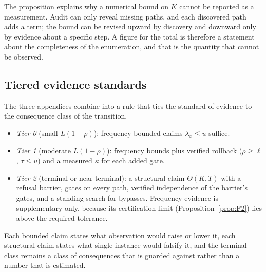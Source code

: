 \documentclass[11pt]{article}
\theoremstyle{definition}
\begin{document}
The proposition explains why a numerical bound on $K$ cannot be reported as a measurement. Audit can only reveal missing paths, and each discovered path adds a term; the bound can be revised upward by discovery and downward only by evidence about a specific step. A figure for the total is therefore a statement about the completeness of the enumeration, and that is the quantity that cannot be observed.

\subsection{Tiered evidence standards}

The three appendices combine into a rule that ties the standard of evidence to the consequence class of the transition.

\begin{itemize}[leftmargin=1.6em,itemsep=0.1em]
\item \emph{Tier 0} (small $L(1-\rho)$): frequency-bounded claims $\lambda_x\le u$ suffice.
\item \emph{Tier 1} (moderate $L(1-\rho)$): frequency bounds plus verified rollback ($\rho\ge\ell$, $\tau\le u$) and a measured $\kappa$ for each added gate.
\item \emph{Tier 2} (terminal or near-terminal): a structural claim $\Theta(K,T)$ with a refusal barrier, gates on every path, verified independence of the barrier's gates, and a standing search for bypasses. Frequency evidence is supplementary only, because its certification limit (Proposition~\ref{prop:F2}) lies above the required tolerance.
\end{itemize}

Each bounded claim states what observation would raise or lower it, each structural claim states what single instance would falsify it, and the terminal class remains a class of consequences that is guarded against rather than a number that is estimated.
\end{document}

